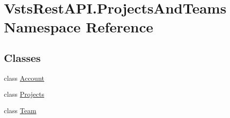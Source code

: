 \hypertarget{namespace_vsts_rest_a_p_i_1_1_projects_and_teams}{}\section{Vsts\+Rest\+A\+P\+I.\+Projects\+And\+Teams Namespace Reference}
\label{namespace_vsts_rest_a_p_i_1_1_projects_and_teams}
\subsection*{Classes}
\begin{DoxyCompactItemize}
\item 
class \mbox{\hyperlink{class_vsts_rest_a_p_i_1_1_projects_and_teams_1_1_account}{Account}}
\item 
class \mbox{\hyperlink{class_vsts_rest_a_p_i_1_1_projects_and_teams_1_1_projects}{Projects}}
\item 
class \mbox{\hyperlink{class_vsts_rest_a_p_i_1_1_projects_and_teams_1_1_team}{Team}}
\end{DoxyCompactItemize}
